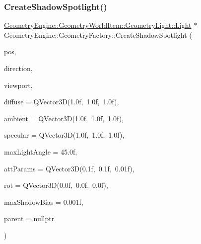 \subsubsection{\texorpdfstring{CreateShadowSpotlight()}{CreateShadowSpotlight()}\hspace{0.1cm}{\footnotesize\ttfamily [2/2]}}
{\footnotesize\ttfamily \mbox{\hyperlink{class_geometry_engine_1_1_geometry_world_item_1_1_geometry_light_1_1_light}{Geometry\+Engine\+::\+Geometry\+World\+Item\+::\+Geometry\+Light\+::\+Light}} $\ast$ Geometry\+Engine\+::\+Geometry\+Factory\+::\+Create\+Shadow\+Spotlight (\begin{DoxyParamCaption}\item[{const Q\+Vector3D \&}]{pos,  }\item[{const Q\+Vector3D \&}]{direction,  }\item[{\mbox{\hyperlink{class_geometry_engine_1_1_geometry_item_utils_1_1_viewport}{Geometry\+Item\+Utils\+::\+Viewport}} $\ast$}]{viewport,  }\item[{const Q\+Vector3D \&}]{diffuse = {\ttfamily QVector3D(1.0f,~1.0f,~1.0f)},  }\item[{const Q\+Vector3D \&}]{ambient = {\ttfamily QVector3D(1.0f,~1.0f,~1.0f)},  }\item[{const Q\+Vector3D \&}]{specular = {\ttfamily QVector3D(1.0f,~1.0f,~1.0f)},  }\item[{float}]{max\+Light\+Angle = {\ttfamily 45.0f},  }\item[{const Q\+Vector3D \&}]{att\+Params = {\ttfamily QVector3D(0.1f,~0.1f,~0.01f)},  }\item[{const Q\+Vector3D \&}]{rot = {\ttfamily QVector3D(0.0f,~0.0f,~0.0f)},  }\item[{float}]{max\+Shadow\+Bias = {\ttfamily 0.001f},  }\item[{\mbox{\hyperlink{class_geometry_engine_1_1_geometry_world_item_1_1_world_item}{Geometry\+World\+Item\+::\+World\+Item}} $\ast$}]{parent = {\ttfamily nullptr} }\end{DoxyParamCaption})\hspace{0.3cm}{\ttfamily [static]}}

